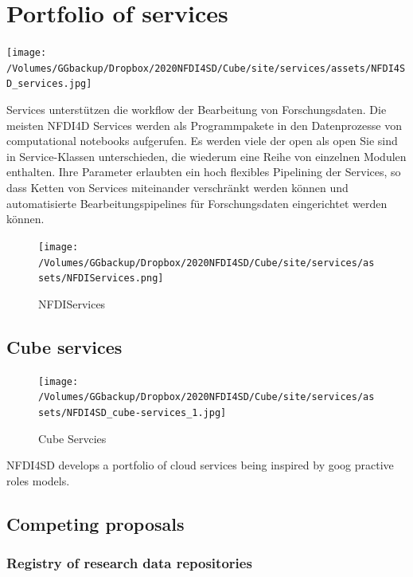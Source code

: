 \documentclass[
  english,
  paper=a4,
  oneside,captions=tableheading
]{scrbook}
\begin{document}
\hypertarget{portfolio-of-services}{%
\section{Portfolio of services}\label{portfolio-of-services}}

\texttt{[image: /Volumes/GGbackup/Dropbox/2020NFDI4SD/Cube/site/services/assets/NFDI4SD\_services.jpg]}

Services unterstützen die workflow der Bearbeitung von Forschungsdaten.
Die meisten NFDI4D Services werden als Programmpakete in den
Datenprozesse von computational notebooks aufgerufen. Es werden viele
der open als open Sie sind in Service-Klassen unterschieden, die
wiederum eine Reihe von einzelnen Modulen enthalten. Ihre Parameter
erlaubten ein hoch flexibles Pipelining der Services, so dass Ketten von
Services miteinander verschränkt werden können und automatisierte
Bearbeitungspipelines für Forschungsdaten eingerichtet werden können.

\begin{figure}
\centering
\texttt{[image: /Volumes/GGbackup/Dropbox/2020NFDI4SD/Cube/site/services/assets/NFDIServices.png]}
\caption{NFDIServices}
\end{figure}

\hypertarget{cube-services}{%
\subsection{Cube services}\label{cube-services}}

\begin{figure}
\centering
\texttt{[image: /Volumes/GGbackup/Dropbox/2020NFDI4SD/Cube/site/services/assets/NFDI4SD\_cube-services\_1.jpg]}
\caption{Cube Servcies}
\end{figure}

NFDI4SD develops a portfolio of cloud services being inspired by goog
practive roles models.

\hypertarget{competing-proposals}{%
\subsection{Competing proposals}\label{competing-proposals}}

\hypertarget{registry-of-research-data-repositories}{%
\subsubsection{Registry of research data
repositories}\label{registry-of-research-data-repositories}}
\end{document}
